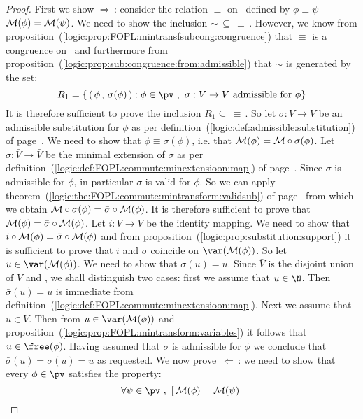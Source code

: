\begin{proof}
First we show $\Rightarrow$\,: consider the relation $\equiv$ on
\pv\ defined by $\phi\equiv\psi$ \ifand\ ${\cal M}(\phi)={\cal
M}(\psi)$. We need to show the inclusion
$\sim\,\subseteq\,\equiv$\,. However, we know from
proposition~(\ref{logic:prop:FOPL:mintransfsubcong:congruence}) that
$\equiv$ is a congruence on \pv\ and furthermore from
proposition~(\ref{logic:prop:sub:congruence:from:admissible}) that
$\sim$ is generated by the set:
    \[
    R_{1}=\left\{\,(\,\phi\,,\,\sigma(\phi)\,):\phi\in\pv\ ,\
    \mbox{$\sigma:V\to V$ admissible for $\phi$} \right\}
    \]
It is therefore sufficient to prove the inclusion
$R_{1}\subseteq\,\equiv$\,. So let $\sigma:V\to V$ be an admissible
substitution for $\phi$ as per
definition~(\ref{logic:def:admissible:substitution}) of
page~\pageref{logic:def:admissible:substitution}. We need to show
that $\phi\equiv\sigma(\phi)$, i.e. that ${\cal M}(\phi)={\cal
M}\circ\sigma(\phi)$. Let $\bar{\sigma}:\bar{V}\to\bar{V}$ be the
minimal extension of $\sigma$ as per
definition~(\ref{logic:def:FOPL:commute:minextensioon:map}) of
page~\pageref{logic:def:FOPL:commute:minextensioon:map}. Since
$\sigma$ is admissible for $\phi$, in particular $\sigma$ is valid
for $\phi$. So we can apply
theorem~(\ref{logic:the:FOPL:commute:mintransform:validsub}) of
page~\pageref{logic:the:FOPL:commute:mintransform:validsub} from
which we obtain ${\cal M}\circ\sigma(\phi)=\bar{\sigma}\circ{\cal
M}(\phi)$. It is therefore sufficient to prove that ${\cal
M}(\phi)=\bar{\sigma}\circ{\cal M}(\phi)$. Let $i:\bar{V}\to\bar{V}$
be the identity mapping. We need to show that $i\circ {\cal
M}(\phi)=\bar{\sigma}\circ{\cal M}(\phi)$ and from
proposition~(\ref{logic:prop:substitution:support}) it is sufficient
to prove that $i$ and $\bar{\sigma}$ coincide on $\var({\cal
M}(\phi))$. So let $u\in\var({\cal M}(\phi))$. We need to show that
$\bar{\sigma}(u)=u$. Since $\bar{V}$ is the disjoint union of $V$
and \N, we shall distinguish two cases: first we assume that
$u\in\N$. Then $\bar{\sigma}(u)=u$ is immediate from
definition~(\ref{logic:def:FOPL:commute:minextensioon:map}). Next we
assume that $u\in V$. Then from $u\in\var({\cal M}(\phi))$ and
proposition~(\ref{logic:prop:FOPL:mintransform:variables}) it
follows that $u\in\free(\phi)$. Having assumed that $\sigma$ is
admissible for $\phi$ we conclude that $\bar{\sigma}(u)=\sigma(u)=u$
as requested. We now prove~$\Leftarrow$\,: we need to show that
every $\phi\in\pv$ satisfies the property:
    \[
    \forall\psi\in\pv\ ,\ [\,{\cal M}(\phi)={\cal M}(\psi)\
\]
\end{proof}
